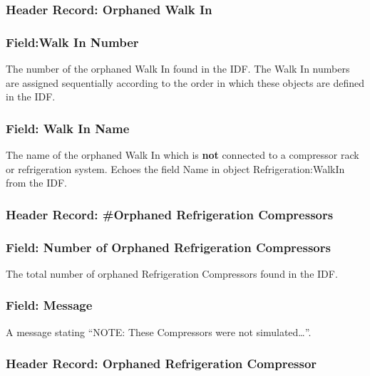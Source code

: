 \subsubsection{Header Record: Orphaned Walk In}\label{header-record-orphaned-walk-in}

\subsubsection{Field:Walk In Number}\label{fieldwalk-in-number}

The number of the orphaned Walk In found in the IDF. The Walk In numbers are assigned sequentially according to the order in which these objects are defined in the IDF.

\subsubsection{Field: Walk In Name}\label{field-walk-in-name-1}

The name of the orphaned Walk In which is \textbf{not} connected to a compressor rack or refrigeration system. Echoes the field Name in object Refrigeration:WalkIn from the IDF.

\subsubsection{Header Record: \#Orphaned Refrigeration Compressors}\label{header-record-orphaned-refrigeration-compressors}

\subsubsection{Field: Number of Orphaned Refrigeration Compressors}\label{field-number-of-orphaned-refrigeration-compressors}

The total number of orphaned Refrigeration Compressors found in the IDF.

\subsubsection{Field: Message}\label{field-message-2}

A message stating ``NOTE: These Compressors were not simulated\ldots{}''.

\subsubsection{Header Record: Orphaned Refrigeration Compressor}\label{header-record-orphaned-refrigeration-compressor}


